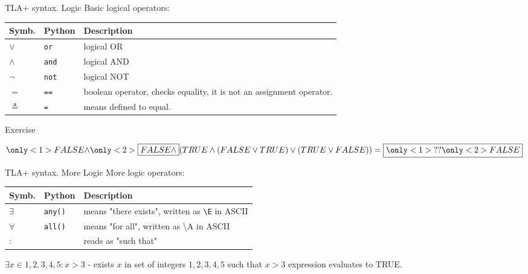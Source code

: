\documentclass[12pt]{beamer}
\begin{document}
  \begin{frame}{TLA+ syntax. Logic}
      Basic logical operators:
        \begin{table}
        \centering
            \begin{tabular}{@{} llp{7cm} @{}}
                Symb.       & Python & Description   \\ \hline
                $\lor$      & \texttt{or} &logical OR \\
                $\land$     & \texttt{and} &logical AND \\
                $\lnot$     & \texttt{not} &logical NOT \\
                $=$         & \texttt{==} & boolean operator, checks equality, it is not an assignment operator. \\
                $\triangleq$& \texttt{=} & means defined to equal.

            \end{tabular}
        \end{table}
  \end{frame}
  \begin{frame}{Exercise}
    \begin{center}
        $ \only<1>{FALSE \land}\only<2>{\boxed{FALSE \land}} (TRUE \land (FALSE \lor TRUE) \lor (TRUE \lor FALSE)) =  \boxed{\only<1>{??}\only<2>{FALSE}}$
    \end{center}
  \end{frame}
  \begin{frame}{TLA+ syntax. More Logic}
      More logic operators:
        \begin{table}
        \centering
            \begin{tabular}{@{} llp{7cm} @{}}
                Symb.  & Python & Description   \\ \hline
                $\exists$ & \texttt{any()} & means "there exists", written as \texttt{\textbackslash E} in ASCII \\
                $\forall$ & \texttt{all()} & means "for all", written as \textbackslash A in ASCII \\
                $:$       &                            & reads as "such that"
            \end{tabular}
        \end{table}

      $\exists x \in {1,2,3,4,5} : x > 3$ - exists $x$ in
      set of integers ${1,2,3,4,5}$ such that $x > 3$ expression evaluates
      to TRUE.
  \end{frame}
\end{document}
